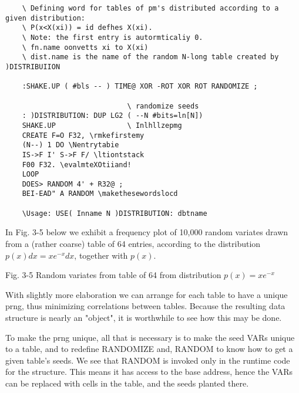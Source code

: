 \begin{verbatim}
	\ Defining word for tables of pm's distributed according to a given distribution:
	\ P(x<X(xi)) = id defhes X(xi).
	\ Note: the first entry is autormticaliy 0.  
	\ fn.name oonvetts xi to X(xi) 
	\ dist.name is the name of the random N-long table created by )DISTRIBUIION

	:SHAKE.UP ( #bls -- ) TIME@ XOR -ROT XOR ROT RANDOMIZE ;

							 \ randomize seeds
	: )DISTRIBUTION: DUP LG2 ( --N #bits=ln[N])
	SHAKE.UP                 \ Inlhllzepmg
	CREATE F=O F32, \rmkefirstemy
	(N--) 1 DO \Nentrytabie
	IS->F I' S->F F/ \ltiontstack
	F00 F32. \evalmteXOtiiand!
	LOOP
	DOES> RANDOM 4' + R32@ ;
	BEI-EAD" A RANDOM \makethesewordslocd

	\Usage: USE( Inname N )DISTRIBUTION: dbtname
\end{verbatim}
In Fig. 3-5 below we exhibit a frequency plot of 10,000 random
variates drawn from a (rather coarse) table of 64 entries, according to the
distribution $p(x)dx=xe^{-x}dx$, together with $p(x)$.

 


 

 

 

 

 

 

 

 

 

 

 

 

Fig. 3-5 Random variates from table of 64 from distribution $p(x)=xe^{-x}$

With slightly more elaboration we can arrange for each table to 
have a unique prng, thus minimizing correlations between
tables. Because the resulting data structure is nearly an "object",
it is worthwhile to see how this may be done.

To make the prng unique, all that is necessary is to make the seed
VARs unique to a table, and to redeﬁne RANDOMIZE and,
RANDOM to know how to get a given table’s seeds. We see that
RANDOM is invoked only in the runtime code for the structure.
This means it has access to the base address, hence the VARs
can be replaced with cells in the table, and the seeds planted there.

